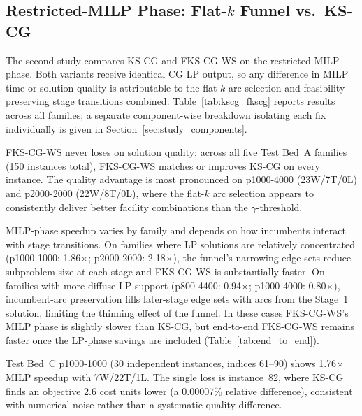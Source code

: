 \subsection{Restricted-MILP Phase: Flat-$k$ Funnel vs.\ KS-CG}
\label{sec:study_milp}

The second study compares KS-CG and FKS-CG-WS on the restricted-MILP phase.
Both variants receive identical CG LP output, so any difference in MILP time
or solution quality is attributable to the flat-$k$ arc selection and
feasibility-preserving stage transitions combined.
Table~\ref{tab:kscg_fkscg} reports results across all families; a separate
component-wise breakdown isolating each fix individually is given in
Section~\ref{sec:study_components}.

FKS-CG-WS never loses on solution quality: across all five Test Bed~A families
(150 instances total), FKS-CG-WS matches or improves KS-CG on every instance.
The quality advantage is most pronounced on p1000-4000 (23W/7T/0L) and
p2000-2000 (22W/8T/0L), where the flat-$k$ arc selection appears to
consistently deliver better facility combinations than the $\gamma$-threshold.

MILP-phase speedup varies by family and depends on how incumbents interact with
stage transitions.
On families where LP solutions are relatively concentrated (p1000-1000: 1.86$\times$;
p2000-2000: 2.18$\times$), the funnel's narrowing edge sets reduce subproblem size
at each stage and FKS-CG-WS is substantially faster.
On families with more diffuse LP support (p800-4400: 0.94$\times$; p1000-4000:
0.80$\times$), incumbent-arc preservation fills later-stage edge sets with arcs
from the Stage~1 solution, limiting the thinning effect of the funnel.
In these cases FKS-CG-WS's MILP phase is slightly slower than KS-CG, but end-to-end
FKS-CG-WS remains faster once the LP-phase savings are included (Table~\ref{tab:end_to_end}).

Test Bed~C p1000-1000 (30 independent instances, indices 61--90) shows
1.76$\times$ MILP speedup with 7W/22T/1L.
The single loss is instance~82, where KS-CG finds an objective 2.6 cost units
lower (a 0.00007\% relative difference), consistent with numerical noise rather
than a systematic quality difference.

